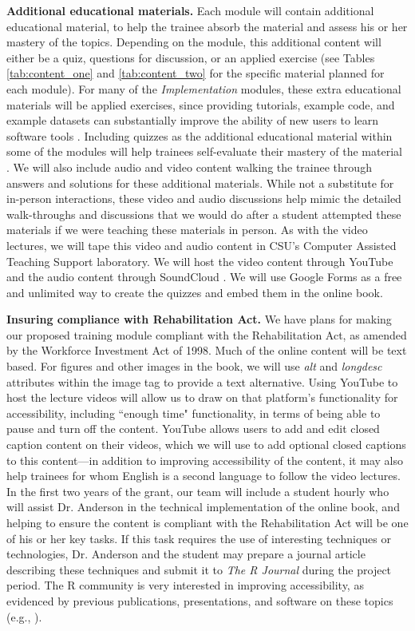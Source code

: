 \documentclass[pdftex,english,11.5pt,parskip=half]{scrartcl}
\begin{document}
\textbf{Additional educational materials.} Each module will contain additional
educational material, to help the trainee absorb the material and assess his or
her mastery of the topics. Depending on the module, this additional content will
either be a quiz, questions for discussion, or an applied exercise (see Tables
\ref*{tab:content_one} and \ref*{tab:content_two} for the specific material
planned for each module). For many of the \textit{Implementation} modules, these extra educational materials will be applied exercises, since providing tutorials, example code, and example datasets can substantially improve the ability of new users to learn software tools \cite{list2017ten, searls2012ten, via2011ten}. Including quizzes as the additional educational material within some of the modules will help trainees self-evaluate their mastery of the material \cite{searls2012ten, via2011ten}. 
We will also include audio and
video content walking the trainee through answers and solutions for these
additional materials. While not a substitute for in-person interactions, these video
and audio discussions help mimic the detailed
walk-throughs and discussions that we would do after a student attempted these
materials if we were teaching these materials in person. As with the video lectures, we will tape this video
and audio content in CSU's Computer Assisted Teaching Support laboratory. We will host the video content through YouTube \cite{youtube} and the
audio content through SoundCloud \cite{soundcloud}. We will use Google Forms \cite{googleforms} as a free and unlimited way
to create the quizzes and embed them in the online book.

\noindent \textbf{Insuring compliance with Rehabilitation Act.} We have plans
for making our proposed training module compliant with the
Rehabilitation Act, as amended by the Workforce Investment
Act of 1998. Much of the online content will be text based. For figures and
other images in the book, we will use \textit{alt} and \textit{longdesc} attributes
within the image tag to provide a text alternative. Using YouTube to host the
lecture videos will allow us to draw on that platform's functionality for accessibility,
including ``enough time" functionality, in terms of being able to pause and turn
off the content. YouTube allows users to add and edit closed caption content on
their videos, which we will use to add optional closed captions to this
content---in addition to improving accessibility of the content, it may also
help trainees for whom English is a second language to follow the video lectures. In
the first two years of the grant, our team will include a student hourly who will assist
Dr. Anderson in the technical implementation of the online book, and helping to
ensure the content is compliant with the Rehabilitation Act will be one of his or her
key tasks. If this task requires the use of interesting techniques or
technologies, Dr. Anderson and the student may prepare a journal article
describing these techniques and submit it to \textit{The R Journal} during the
project period. The R community is very interested in improving
accessibility, as evidenced by previous publications, presentations, and
software on these topics (e.g., \cite{uswebr, godfrey2013statistical}).
\end{document}
